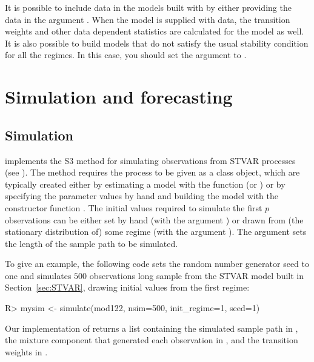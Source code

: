 \documentclass[nojss]{jss}
\begin{document}
It is possible to include data in the models built with  by either providing the data in the argument . When the model is supplied with data, the transition weights and other data dependent statistics are calculated for the model as well. It is also possible to build models that do not satisfy the usual stability condition for all the regimes. In this case, you should set the argument  to .


\section{Simulation and forecasting}\label{sec:simufore}

\subsection{Simulation}\label{sec:simu}

 implements the S3 method  for simulating observations from STVAR processes (see ). The method requires the process to be given as a class  object, which are typically created either by estimating a model with the function  (or ) or by specifying the parameter values by hand and building the model with the constructor function . The initial values required to simulate the first $p$ observations can be either set by hand (with the argument ) or drawn from (the stationary distribution of) some regime (with the argument ). The argument  sets the length of the sample path to be simulated.

To give an example, the following code sets the random number generator seed to one and simulates $500$ observations long sample from the STVAR model built in Section~\ref{sec:STVAR}, drawing initial values from the first regime:
%
\begin{CodeChunk}
\begin{CodeInput}
R> mysim <- simulate(mod122, nsim=500, init_regime=1, seed=1)
\end{CodeInput}
\end{CodeChunk}
%
Our implementation of  returns a list containing the simulated sample path in , the mixture component that generated each observation in , and the transition weights in .
\end{document}
